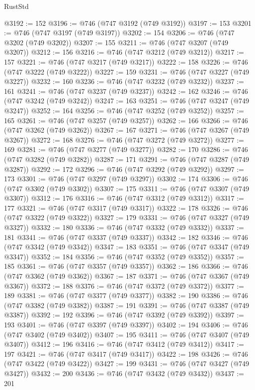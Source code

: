\begin{lexlean}{RustStd}
\begin{coremodule}
@3192 := 152
@3196 := @746 (@747 @3192 (@749 @3192))
@3197 := 153
@3201 := @746 (@747 @3197 (@749 @3197))
@3202 := 154
@3206 := @746 (@747 @3202 (@749 @3202))
@3207 := 155
@3211 := @746 (@747 @3207 (@749 @3207))
@3212 := 156
@3216 := @746 (@747 @3212 (@749 @3212))
@3217 := 157
@3221 := @746 (@747 @3217 (@749 @3217))
@3222 := 158
@3226 := @746 (@747 @3222 (@749 @3222))
@3227 := 159
@3231 := @746 (@747 @3227 (@749 @3227))
@3232 := 160
@3236 := @746 (@747 @3232 (@749 @3232))
@3237 := 161
@3241 := @746 (@747 @3237 (@749 @3237))
@3242 := 162
@3246 := @746 (@747 @3242 (@749 @3242))
@3247 := 163
@3251 := @746 (@747 @3247 (@749 @3247))
@3252 := 164
@3256 := @746 (@747 @3252 (@749 @3252))
@3257 := 165
@3261 := @746 (@747 @3257 (@749 @3257))
@3262 := 166
@3266 := @746 (@747 @3262 (@749 @3262))
@3267 := 167
@3271 := @746 (@747 @3267 (@749 @3267))
@3272 := 168
@3276 := @746 (@747 @3272 (@749 @3272))
@3277 := 169
@3281 := @746 (@747 @3277 (@749 @3277))
@3282 := 170
@3286 := @746 (@747 @3282 (@749 @3282))
@3287 := 171
@3291 := @746 (@747 @3287 (@749 @3287))
@3292 := 172
@3296 := @746 (@747 @3292 (@749 @3292))
@3297 := 173
@3301 := @746 (@747 @3297 (@749 @3297))
@3302 := 174
@3306 := @746 (@747 @3302 (@749 @3302))
@3307 := 175
@3311 := @746 (@747 @3307 (@749 @3307))
@3312 := 176
@3316 := @746 (@747 @3312 (@749 @3312))
@3317 := 177
@3321 := @746 (@747 @3317 (@749 @3317))
@3322 := 178
@3326 := @746 (@747 @3322 (@749 @3322))
@3327 := 179
@3331 := @746 (@747 @3327 (@749 @3327))
@3332 := 180
@3336 := @746 (@747 @3332 (@749 @3332))
@3337 := 181
@3341 := @746 (@747 @3337 (@749 @3337))
@3342 := 182
@3346 := @746 (@747 @3342 (@749 @3342))
@3347 := 183
@3351 := @746 (@747 @3347 (@749 @3347))
@3352 := 184
@3356 := @746 (@747 @3352 (@749 @3352))
@3357 := 185
@3361 := @746 (@747 @3357 (@749 @3357))
@3362 := 186
@3366 := @746 (@747 @3362 (@749 @3362))
@3367 := 187
@3371 := @746 (@747 @3367 (@749 @3367))
@3372 := 188
@3376 := @746 (@747 @3372 (@749 @3372))
@3377 := 189
@3381 := @746 (@747 @3377 (@749 @3377))
@3382 := 190
@3386 := @746 (@747 @3382 (@749 @3382))
@3387 := 191
@3391 := @746 (@747 @3387 (@749 @3387))
@3392 := 192
@3396 := @746 (@747 @3392 (@749 @3392))
@3397 := 193
@3401 := @746 (@747 @3397 (@749 @3397))
@3402 := 194
@3406 := @746 (@747 @3402 (@749 @3402))
@3407 := 195
@3411 := @746 (@747 @3407 (@749 @3407))
@3412 := 196
@3416 := @746 (@747 @3412 (@749 @3412))
@3417 := 197
@3421 := @746 (@747 @3417 (@749 @3417))
@3422 := 198
@3426 := @746 (@747 @3422 (@749 @3422))
@3427 := 199
@3431 := @746 (@747 @3427 (@749 @3427))
@3432 := 200
@3436 := @746 (@747 @3432 (@749 @3432))
@3437 := 201

\end{coremodule}
\end{lexlean}
